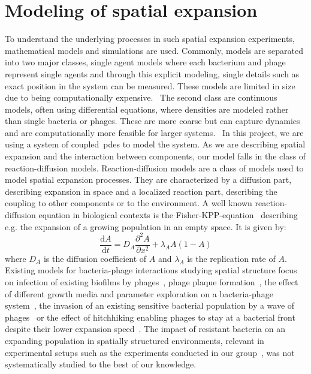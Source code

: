 \section{Modeling of spatial expansion}
To understand the underlying processes in such spatial expansion experiments, mathematical models and simulations are used. Commonly, models are separated into two major classes, single agent models where each bacterium and phage represent single agents and through this explicit modeling, single details such as exact position in the system can be measured. These models are limited in size due to being computationally expensive.~\cite{Nagarajan2022-rv} The second class are continuous models, often using differential equations, where densities are modeled rather than single bacteria or phages. These are more coarse but can capture dynamics and are computationally more feasible for larger systems.~\cite{Succurro2018-if} In this project, we are using a system of coupled~\gls{pde}s to model the system. As we are describing spatial expansion and the interaction between components, our model falls in the class of reaction-diffusion models. 
Reaction-diffusion models are a class of models used to model spatial expansion processes. They are characterized by a diffusion part, describing expansion in space and a localized reaction part, describing the coupling to other components or to the environment. A well known reaction-diffusion equation in biological contexts is the Fisher-KPP-equation~\cite{Fisher1937-rd} describing e.g. the expansion of a growing population in an empty space. It is given by:
\begin{equation}
    \frac{\text{d}A}{\text{d}t} = D_A \frac{\partial^2A}{\partial x^2} + \lambda_A A (1-A)
\end{equation}
where $D_A$ is the diffusion coefficient of $A$ and $\lambda_A$ is the replication rate of $A$.
Existing models for bacteria-phage interactions studying spatial structure focus on infection of existing biofilms by phages~\cite{Simmons2020-cc}, phage plaque formation~\cite{Valdez2025-io, Smith2011-ae, Yin1992-th}, the effect of different growth media and parameter exploration on a bacteria-phage system~\cite{Wang2024-ye}, the invasion of an existing sensitive bacterial population by a wave of phages~\cite{Claydon2021-cu} or the effect of hitchhiking enabling phages to stay at a bacterial front despite their lower expansion speed~\cite{Ping2020-vd}. The impact of resistant bacteria on an expanding population in spatially structured environments, relevant in experimental setups such as the experiments conducted in our group~\cite{Shaer-Tamar2022-cq}, was not systematically studied to the best of our knowledge.